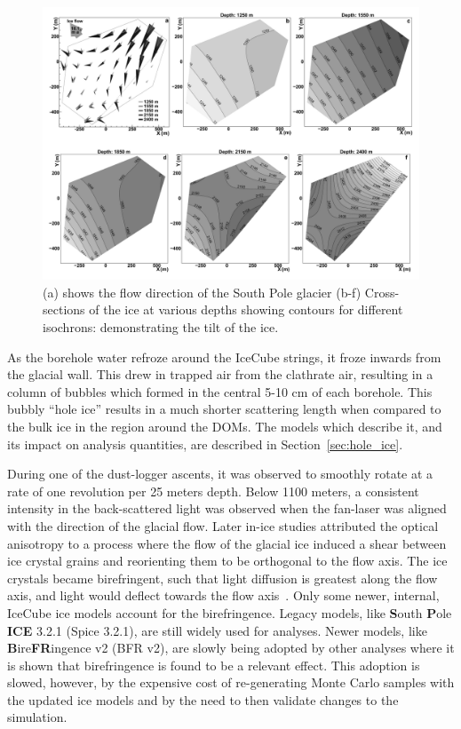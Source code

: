 \documentclass[main.tex]{subfiles}
\begin{document}
\begin{figure}  
    \centering
    \includegraphics[width=0.8\linewidth]{figures/icecube_isochron.png}
    \caption{(a) shows the flow direction of the South Pole glacier (b-f) Cross-sections of the ice at various depths showing contours for different isochrons: demonstrating the tilt of the ice.}\label{fig:isochron}
\end{figure}

As the borehole water refroze around the IceCube strings, it froze inwards from the glacial wall. 
This drew in trapped air from the clathrate air, resulting in a column of bubbles which formed in the central 5-10 cm of each borehole.
This bubbly ``hole ice'' results in a much shorter scattering length when compared to the bulk ice in the region around the DOMs. 
The models which describe it, and its impact on analysis quantities, are described in Section~\ref{sec:hole_ice}. 

During one of the dust-logger ascents, it was observed to smoothly rotate at a rate of one revolution per 25 meters depth. 
Below 1100 meters, a consistent intensity in the back-scattered light was observed when the fan-laser was aligned with the direction of the glacial flow. 
Later in-ice studies attributed the optical anisotropy to a process where the flow of the glacial ice induced a shear between ice crystal grains and reorienting them to be orthogonal to the flow axis. 
The ice crystals became birefringent, such that light diffusion is greatest along the flow axis, and light would deflect towards the flow axis~\cite{ice_anisotropy, ice_birefringence}.
Only some newer, internal, IceCube ice models account for the birefringence. 
Legacy models, like \textbf{S}outh \textbf{P}ole \textbf{ICE} 3.2.1 (Spice 3.2.1), are still widely used for analyses.
Newer models, like \textbf{B}ire\textbf{FR}ingence v2 (BFR v2), are slowly being adopted by other analyses where it is shown that birefringence is found to be a relevant effect. 
This adoption is slowed, however, by the expensive cost of re-generating Monte Carlo samples with the updated ice models and by the need to then validate changes to the simulation. 
\end{document}
